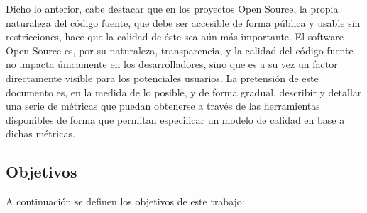\documentclass[11pt]{article}
\begin{document}
Dicho lo anterior, cabe destacar que en los proyectos Open Source, la propia naturaleza del código fuente, que debe ser accesible de forma pública y usable sin restricciones, hace que la calidad de éste sea aún más importante. El software Open Source es, por su naturaleza, transparencia, y la calidad del código fuente no impacta únicamente en los desarrolladores, sino que es a su vez un factor directamente visible para los potenciales usuarios.
La pretensión de este documento es, en la medida de lo posible, y de forma gradual, describir y detallar una serie de métricas que puedan obtenerse a través de las herramientas disponibles de forma que permitan especificar un modelo de calidad en base a dichas métricas.

\subsection{Objetivos}
A continuación se definen los objetivos de este trabajo:
\end{document}
